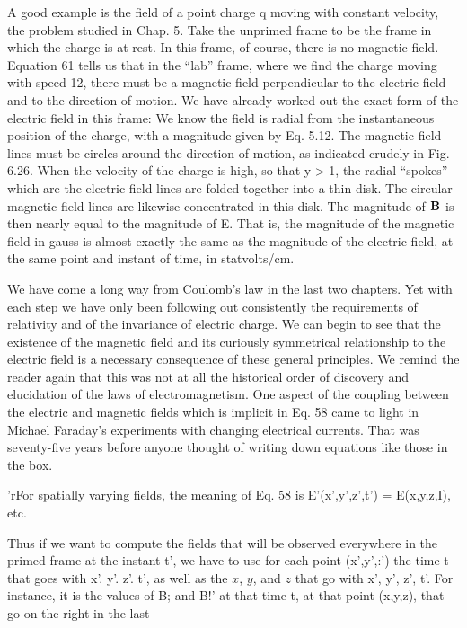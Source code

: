 A good example is the field of a point charge q moving with constant
velocity, the problem studied in Chap. 5. Take the unprimed
frame to be the frame in which the charge is at rest. In this frame,
of course, there is no magnetic field. Equation 61 tells us that in the
``lab'' frame, where we find the charge moving with speed 12, there
must be a magnetic field perpendicular to the electric field and to the
direction of motion. We have already worked out the exact form of
the electric field in this frame: We know the field is radial from the
instantaneous position of the charge, with a magnitude given by
Eq. 5.12. The magnetic field lines must be circles around the direction
of motion, as indicated crudely in Fig. 6.26. When the velocity
of the charge is high, so that y > 1, the radial ``spokes'' which are the
electric field lines are folded together into a thin disk. The circular
magnetic field lines are likewise concentrated in this disk. The magnitude
of $\mathbf{B}$ is then nearly equal to the magnitude of E. That is, the
magnitude of the magnetic field in gauss is almost exactly the same
as the magnitude of the electric field, at the same point and instant
of time, in statvolts/cm.

We have come a long way from Coulomb's law in the last two
chapters. Yet with each step we have only been following out consistently
the requirements of relativity and of the invariance of electric
charge. We can begin to see that the existence of the magnetic
field and its curiously symmetrical relationship to the electric field
is a necessary consequence of these general principles. We remind
the reader again that this was not at all the historical order of discovery
and elucidation of the laws of electromagnetism. One aspect
of the coupling between the electric and magnetic fields which is
implicit in Eq. 58 came to light in Michael Faraday's experiments
with changing electrical currents. That was seventy-five years before
anyone thought of writing down equations like those in the box.

'rFor spatially varying fields, the meaning of Eq. 58 is E'(x',y',z',t') = E(x,y,z,I), etc.

Thus if we want to compute the fields that will be observed everywhere in the primed
frame at the instant t', we have to use for each point (x',y',:') the time t that goes with
x'. y'. z'. t', as well as the $x$, $y$, and $z$ that go with x', y', z', t'. For instance, it is the
values of B; and B!' at that time t, at that point (x,y,z), that go on the right in the last

